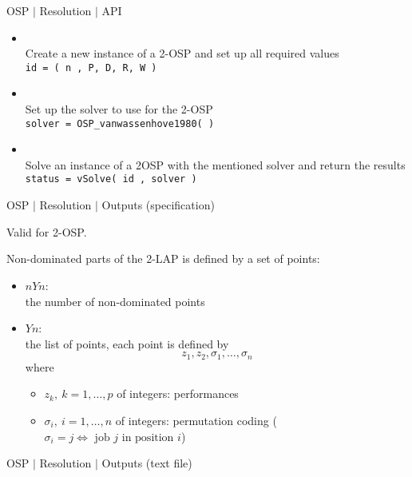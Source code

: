 %
% 
\begin{frame}{OSP $\mid$ Resolution $\mid$ API}

\begin{itemize}
\item  {}\\
          Create a new instance of a 2-OSP and set up all required values    \\
           \texttt{id = \texttt{( n , P, D, R, W ) }} 
           \medskip
\item  {} \\
          Set up the solver to use for the 2-OSP\\
          \texttt{solver = OSP\_vanwassenhove1980( ) }
          \medskip
\item  {}\\
          Solve an instance of a 2OSP with the mentioned solver and return the results \\
          \texttt{status = vSolve( id , solver ) }
          \medskip
\end{itemize}

\end{frame}

%
% 
\begin{frame}{OSP $\mid$ Resolution $\mid$ Outputs (specification)}

Valid for 2-OSP.
\bigskip

Non-dominated parts of the 2-LAP is defined by a set of points:
\medskip
                           \begin{itemize}
                              \item $nYn$: \\ the number of non-dominated points
                              \item $Yn$: \\the list of points,  each point is defined by 
                              $$ z_1, z_2, \sigma_1, \dots, \sigma_n$$
                              where
                               \begin{itemize}
                                     \item $z_k, \ k=1,\dots,p$ of integers:  performances 
                                     \item $\sigma_i, \ i=1,\dots,n$ of integers:  permutation coding ($\sigma_i=j  \Leftrightarrow \mbox{ job } j \mbox{ in position } i$)
                                \end{itemize}
                           \end{itemize}               

\end{frame}

%
% 
\begin{frame}{OSP $\mid$ Resolution $\mid$ Outputs (text file)}
\end{frame}
